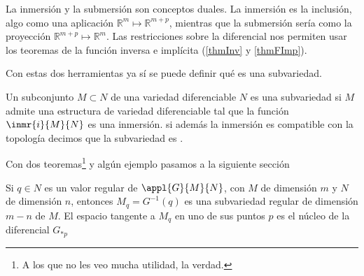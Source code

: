 La inmersión y la submersión son conceptos duales. La inmersión es la inclusión, algo como una aplicación $ℝ^m \longmapsto ℝ^{m+p}$, mientras que la submersión sería como la proyección $ℝ^{m+p} \longmapsto ℝ^m$. Las restricciones sobre la diferencial nos permiten usar los teoremas de la función inversa e implícita (\ref{thmInv} y \ref{thmFImp}).

Con estas dos herramientas ya sí se puede definir qué es una subvariedad.

\begin{defn}[Subvariedad] Un subconjunto $M \subset N$ de una variedad diferenciable $N$ es una subvariedad si $M$ admite una estructura de variedad diferenciable tal que la función $\inmr{i}{M}{N}$ es una inmersión. si además la inmersión es compatible con la topología decimos que la subvariedad es .
\end{defn}

Con dos teoremas\footnote{A los que no les veo mucha utilidad, la verdad.} y algún ejemplo pasamos a la siguiente sección

\begin{theorem}
Si $q \in N$ es un valor regular de $\appl{G}{M}{N}$, con $M$ de dimensión $m$ y $N$ de dimensión $n$, entonces $M_q=G^{-1}(q)$ es una subvariedad regular de dimensión $m-n$ de $M$. El espacio tangente a $M_q$ en uno de sus puntos $p$ es el núcleo de la diferencial $G_{*p}$
\end{theorem}

